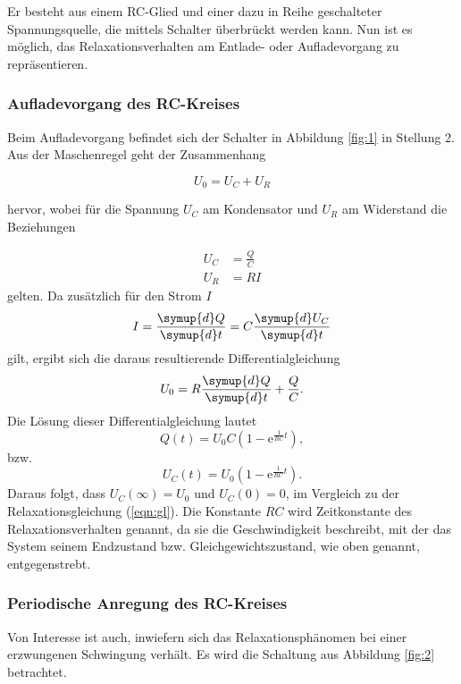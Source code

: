 Er besteht aus einem RC-Glied und einer dazu in Reihe geschalteter Spannungsquelle, die mittels Schalter überbrückt werden kann.
Nun ist es möglich, das Relaxationsverhalten am Entlade- oder Aufladevorgang zu repräsentieren.
\subsubsection{Aufladevorgang des RC-Kreises}
Beim Aufladevorgang befindet sich der Schalter in Abbildung \ref{fig:1} in Stellung 2.
Aus der Maschenregel geht der Zusammenhang

\begin{equation}
  U_0 = U_C + U_R \label{eqn:1}
\end{equation}

hervor, wobei für die Spannung $U_C$ am Kondensator und $U_R$ am Widerstand die Beziehungen

\begin{align*}
  U_C &= \frac{Q}{C}\\
  U_R &= RI
\end{align*}
gelten.
Da zusätzlich für den Strom $I$
\begin{equation}
  I = \frac{\symup{d} Q}{\symup{d} t} = C\frac{\symup{d} U_C}{\symup{d} t} \label{eqn:2}
\end{equation}
gilt, ergibt sich die daraus resultierende Differentialgleichung
\begin{equation}
  U_0 = R\frac{\symup{d} Q}{\symup{d} t} + \frac{Q}{C}.
\end{equation}
Die Lösung dieser Differentialgleichung lautet
\begin{equation}
  Q(t) = U_0C(1-\mathrm{e}^{\frac{1}{RC}t}),
\end{equation}
bzw.
\begin{equation}
  U_C(t) = U_0(1-\mathrm{e}^{\frac{1}{RC}t}). \label{eqn:gl2}
\end{equation}
Daraus folgt, dass $U_C(\infty) = U_0$ und $U_C(0) = 0$, im Vergleich zu der Relaxationsgleichung (\ref{eqn:gl}).
Die Konstante $RC$ wird Zeitkonstante des Relaxationsverhalten genannt, da sie die Geschwindigkeit beschreibt, mit der das System seinem Endzustand bzw. Gleichgewichtszustand, wie oben genannt, entgegenstrebt.\\
\subsubsection{Periodische Anregung des RC-Kreises}
Von Interesse ist auch, inwiefern sich das Relaxationsphänomen bei einer erzwungenen Schwingung verhält.
Es wird die Schaltung aus Abbildung \ref{fig:2} betrachtet.

